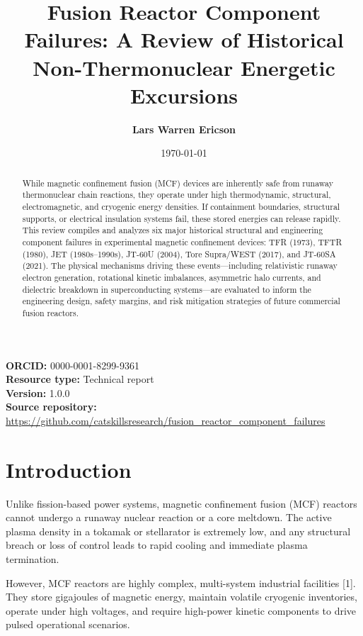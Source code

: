 \documentclass[11pt,a4paper]{article}
\title{\textbf{Fusion Reactor Component Failures: A Review of Historical Non-Thermonuclear Energetic Excursions}}
\author[1]{\textbf{Lars Warren Ericson}}
\affil[1]{Catskills Research Company}
\affil[1]{\texttt{lars.ericson@catskillsresearch.com}}
\date{\today}
\begin{document}
\maketitle

\begin{center}
  \small
  \textbf{ORCID:} 0000-0001-8299-9361 \\
  \textbf{Resource type:} Technical report \\
  \textbf{Version:} 1.0.0 \\[0.5em]
  \textbf{Source repository:} \url{https://github.com/catskillsresearch/fusion_reactor_component_failures}
\end{center}

\begin{abstract}
While magnetic confinement fusion (MCF) devices are inherently safe from runaway thermonuclear chain reactions, they operate under high thermodynamic, structural, electromagnetic, and cryogenic energy densities. If containment boundaries, structural supports, or electrical insulation systems fail, these stored energies can release rapidly. This review compiles and analyzes six major historical structural and engineering component failures in experimental magnetic confinement devices: TFR (1973), TFTR (1980), JET (1980s–1990s), JT-60U (2004), Tore Supra/WEST (2017), and JT-60SA (2021). The physical mechanisms driving these events—including relativistic runaway electron generation, rotational kinetic imbalances, asymmetric halo currents, and dielectric breakdown in superconducting systems—are evaluated to inform the engineering design, safety margins, and risk mitigation strategies of future commercial fusion reactors.
\end{abstract}

\hypertarget{introduction}{%
\section{Introduction}\label{introduction}}

Unlike fission-based power systems, magnetic confinement fusion (MCF) reactors cannot undergo a runaway nuclear reaction or a core meltdown. The active plasma density in a tokamak or stellarator is extremely low, and any structural breach or loss of control leads to rapid cooling and immediate plasma termination.

However, MCF reactors are highly complex, multi-system industrial facilities {[}1{]}. They store gigajoules of magnetic energy, maintain volatile cryogenic inventories, operate under high voltages, and require high-power kinetic components to drive pulsed operational scenarios.
\end{document}
